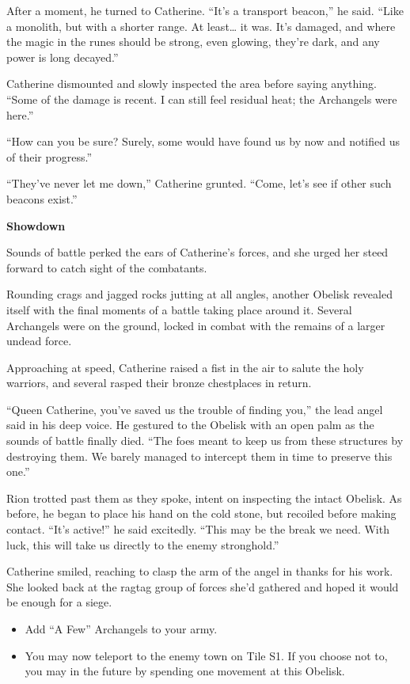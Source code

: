 \begin{multicols*}{2}
After a moment, he turned to Catherine. ``It's a transport beacon,'' he said. ``Like a monolith, but with a shorter range. At least… it was. It's damaged, and where the magic in the runes should be strong, even glowing, they're dark, and any power is long decayed.''

Catherine dismounted and slowly inspected the area before saying anything. ``Some of the damage is recent. I can still feel residual heat; the Archangels were here.''

``How can you be sure? Surely, some would have found us by now and notified us of their progress.''

``They've never let me down,'' Catherine grunted. ``Come, let's see if other such beacons exist.''

\textbf{Showdown}

Sounds of battle perked the ears of Catherine's forces, and she urged her steed forward to catch sight of the combatants.

Rounding crags and jagged rocks jutting at all angles, another Obelisk revealed itself with the final moments of a battle taking place around it. Several Archangels were on the ground, locked in combat with the remains of a larger undead force.

Approaching at speed, Catherine raised a fist in the air to salute the holy warriors, and several rasped their bronze chestplaces in return.

``Queen Catherine, you've saved us the trouble of finding you,'' the lead angel said in his deep voice. He gestured to the Obelisk with an open palm as the sounds of battle finally died. ``The foes meant to keep us from these structures by destroying them. We barely managed to intercept them in time to preserve this one.''

Rion trotted past them as they spoke, intent on inspecting the intact Obelisk. As before, he began to place his hand on the cold stone, but recoiled before making contact. ``It's active!'' he said excitedly. ``This may be the break we need. With luck, this will take us directly to the enemy stronghold.''

Catherine smiled, reaching to clasp the arm of the angel in thanks for his work. She looked back at the ragtag group of forces she'd gathered and hoped it would be enough for a siege.

\begin{itemize}
  \item \textcolor{darkcandyapplered}{Add ``A Few'' Archangels to your army.}
  \item \textcolor{darkcandyapplered}{You may now teleport to the enemy town on Tile S1. If you choose not to, you may in the future by spending one movement at this Obelisk.}
\end{itemize}



\end{multicols*}
